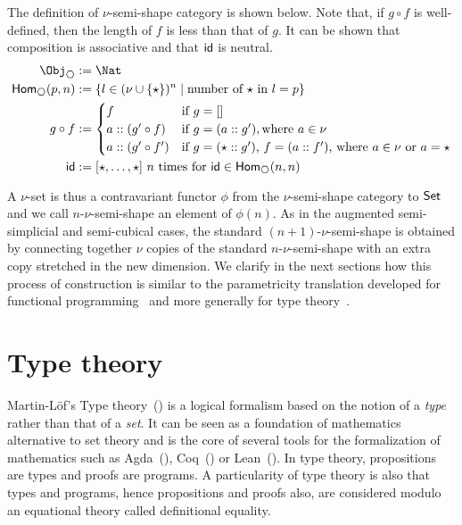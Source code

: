\documentclass{msc}
\newcommand{\kstar}{{\star}}
\begin{document}
\begin{definition}[$\hexagon$]
  The definition of $\nu$-semi-shape category is shown below. Note that, if $g \circ f$ is well-defined, then the length of $f$ is less than that of $g$. It can be shown that composition is associative and that $\mathsf{id}$ is neutral.
  \begin{align*}
    \Obj_{\hexagon}       & := \Nat                                                                           \\
    \Hom_{\hexagon}(p, n) & := \{l \in (\nu \cup \{\kstar\})^n \mid \text{number of $\kstar$ in $l = p$}\}    \\
    g \circ f             & :=
    \begin{cases}
      f                  & \text{if $g = []$}                                                                 \\
      a :: (g' \circ f)  & \text{if $g = (a :: g')$}, \text{where $a \in \nu$}                                \\
      a :: (g' \circ f') & \text{if $g = (\kstar :: g')$, $f = (a :: f')$, where $a \in \nu$ or $a = \kstar$} \\
    \end{cases}   \\
    \id                   & := [\kstar, \ldots, \kstar] \text{ $n$ times for $\id \in \Hom_{\hexagon}(n, n)$}
  \end{align*}
\end{definition}

A $\nu$-set is thus a contravariant functor $\phi$ from the $\nu$-semi-shape category to $\mathsf{Set}$ and we call $n$-$\nu$-semi-shape an element of $\phi(n)$. As in the augmented semi-simplicial and semi-cubical cases, the standard $(n + 1)$-$\nu$-semi-shape is obtained by connecting together $\nu$ copies of the standard $n$-$\nu$-semi-shape with an extra copy stretched in the new dimension. We clarify in the next sections how this process of construction is similar to the parametricity translation developed for functional programming~\citep{reynolds83} and more generally for type theory~\citep{bernardy10, bernardy11, atkey14, bernardy15}.

\section{Type theory}
Martin-Löf's Type theory~(\citeyear{martinlof75,martinlof84}) is a logical formalism based on the notion of a \emph{type} rather than that of a \emph{set}. It can be seen as a foundation of mathematics alternative to set theory and is the core of several tools for the formalization of mathematics such as Agda~(\citeyear{agda23}), Coq~(\citeyear{coq23}) or Lean~(\citeyear{lean15}). In type theory, propositions are types and proofs are programs. A particularity of type theory is also that types and programs, hence propositions and proofs also, are considered modulo an equational theory called definitional equality.
\end{document}
